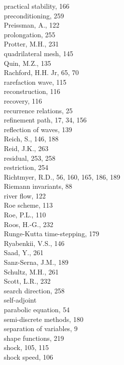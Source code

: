 \documentclass[10pt]{article}
\begin{document}
practical stability, 166\\
preconditioning, 259\\
Preissman, A., 122\\
prolongation, 255\\
Protter, M.H., 231\\
quadrilateral mesh, 145\\
Quin, M.Z., 135\\
Rachford, H.H. Jr, 65, 70\\
rarefaction wave, 115\\
reconstruction, 116\\
recovery, 116\\
recurrence relations, 25\\
refinement path, 17, 34, 156\\
reflection of waves, 139\\
Reich, S., 146, 188\\
Reid, J.K., 263\\
residual, 253, 258\\
restriction, 254\\
Richtmyer, R.D., 56, 160, 165, 186, 189\\
Riemann invariants, 88\\
river flow, 122\\
Roe scheme, 113\\
Roe, P.L., 110\\
Roos, H.-G., 232\\
Runge-Kutta time-stepping, 179\\
Ryabenkii, V.S., 146\\
Saad, Y., 261\\
Sanz-Serna, J.M., 189\\
Schultz, M.H., 261\\
Scott, L.R., 232\\
search direction, 258\\
self-adjoint\\
parabolic equation, 54\\
semi-discrete methods, 180\\
separation of variables, 9\\
shape functions, 219\\
shock, 105, 115\\
shock speed, 106
\end{document}

